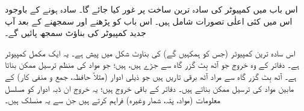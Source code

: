 اس باب میں کمپیوٹر کی سادہ ترین ساخت پر غور کیا جائے گا۔ سادہ ہونے کے باوجود اس میں   کئی   اعلٰی  تصورات شامل ہیں۔ اس باب کو پڑھنے اور   سمجھنے  کے بعد آپ جدید کمپیوٹر کی بناؤٹ سمجھ پائیں گے۔

اس سادہ  ترین کمپیوٹر  (جس کو ہمکہیں گے) کی  بناوٹ شکل  میں پیش ہے۔ یہ ایک مکمل کمپیوٹر ہے۔   دفاتر کے    وہ خروج جو آٹھ بِٹ گزر گاہ     سے جڑے ہیں،      ہیں؛  جو  مواد کی  منظم ترسیل ممکن بناتا  ہے۔ آٹھ بِٹ  گزر گاہ سے مراد آٹھ برقی تاریں ہیں جو    ذیلی ادوار (مثلاً حافظہ، جمع و منفی کار)  کے مابین مواد کی ترسیل ممکن بناتے ہیں۔ دفاتر کے باقی خروج  ہیں؛ یہ خروج   ان ڈبہ ادوار کو مسلسل   معلومات (مواد، پتہ، شمار وغیرہ)  فراہم کرتے ہیں جن سے یہ منسلک ہیں۔

